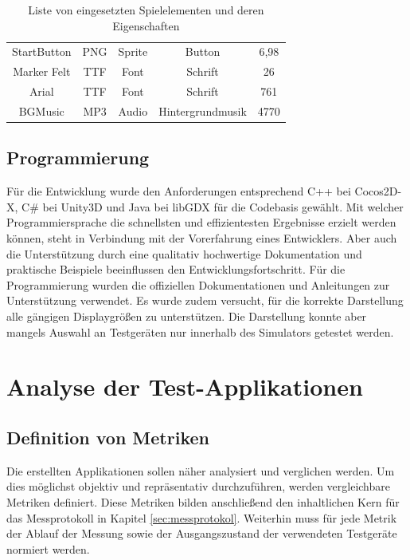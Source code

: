 \begin{table}[htbp]
{\begin{tabular}{ccccc}
			\rowcolor[HTML]{C0C0C0} 
			{\color[HTML]{000000} StartButton} & {\color[HTML]{000000} PNG}      & {\color[HTML]{000000} Sprite}        & {\color[HTML]{000000} Button}           & {\color[HTML]{000000}6,98}           \\
			{\color[HTML]{000000} Marker Felt} & {\color[HTML]{000000} TTF}      & {\color[HTML]{000000} Font}          & {\color[HTML]{000000} Schrift}          & {\color[HTML]{000000}26}           \\
			\rowcolor[HTML]{C0C0C0} 
			{\color[HTML]{000000} Arial}       & {\color[HTML]{000000} TTF}      & {\color[HTML]{000000} Font}          & {\color[HTML]{000000} Schrift}          & {\color[HTML]{000000}761}           \\
			{\color[HTML]{000000} BGMusic}     & {\color[HTML]{000000} MP3}      & {\color[HTML]{000000} Audio}         & {\color[HTML]{000000} Hintergrundmusik} & {\color[HTML]{000000}4770}          
		\end{tabular}
	}
	\caption{Liste von eingesetzten Spielelementen und deren Eigenschaften}
	\label{spiel_komponenten}
\end{table}

\section{Programmierung}
Für die Entwicklung wurde den Anforderungen entsprechend C++ bei Cocos2D-X, C\# bei Unity3D und Java bei libGDX für die Codebasis gewählt. Mit welcher Programmiersprache die schnellsten und effizientesten Ergebnisse erzielt werden können, steht in Verbindung mit der Vorerfahrung eines Entwicklers. Aber auch die Unterstützung durch eine qualitativ hochwertige Dokumentation und praktische Beispiele beeinflussen den Entwicklungsfortschritt. Für die Programmierung wurden die offiziellen Dokumentationen und Anleitungen zur Unterstützung verwendet. Es wurde zudem versucht, für die korrekte Darstellung alle gängigen Displaygrößen zu unterstützen. Die Darstellung konnte aber mangels Auswahl an Testgeräten nur innerhalb des Simulators getestet werden.


\chapter{Analyse der Test-Applikationen}
\label{sec:analyse_der_apps}

\section{Definition von Metriken}
Die erstellten Applikationen sollen näher analysiert und verglichen werden. Um dies möglichst objektiv und repräsentativ durchzuführen, werden vergleichbare Metriken definiert. Diese Metriken bilden anschließend den inhaltlichen Kern für das Messprotokoll in Kapitel \ref{sec:messprotokol}. Weiterhin muss für jede Metrik der Ablauf der Messung sowie der Ausgangszustand der verwendeten Testgeräte normiert werden.

